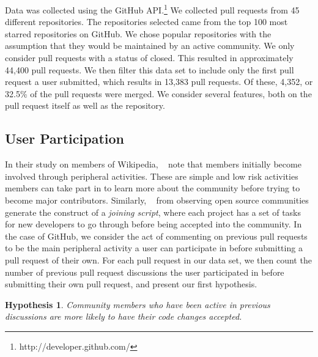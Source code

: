 \documentclass[12pt]{article}
\newtheorem{hyp}{Hypothesis}
\begin{document}
Data was collected using the GitHub API.\footnote{http://developer.github.com/}
We collected pull requests from 45 different repositories. The repositories
selected came from the top 100 most starred repositories on GitHub. We chose
popular repositories with the assumption that they would be maintained by an
active community. We only consider pull requests with a status of closed. This
resulted in approximately 44,400 pull requests. We then filter this data set to
include only the first pull request a user submitted, which results in 13,383
pull requests. Of these, 4,352, or 32.5\% of the pull requests were merged. We
consider several features, both on the pull request itself as well as the
repository.

\subsection{User Participation}
In their study on members of Wikipedia, ~\cite{bryant_becoming_2005} note that
members initially become involved through peripheral activities. These are
simple and low risk activities members can take part in to learn more about the
community before trying to become major contributors. Similarly,
~\cite{von_krogh_community_2003} from observing open source communities generate
the construct of a \textit{joining script}, where each project has a set of
tasks for new developers to go through before being accepted into the community.
In the case of GitHub, we consider the act of commenting on previous pull
requests to be the main peripheral activity a user can participate in before
submitting a pull request of their own. For each pull request in our data set,
we then count the number of previous pull request discussions the user
participated in before submitting their own pull request, and present our first
hypothesis.

\begin{hyp}
Community members who have been active in previous discussions are more likely
to have their code changes accepted.
\end{hyp}
\end{document}
